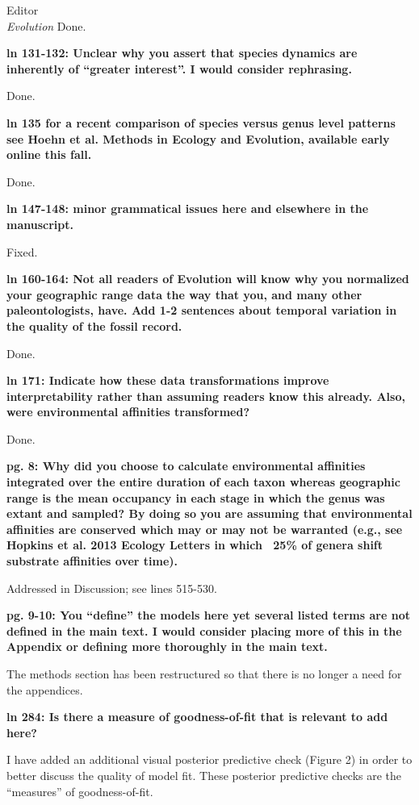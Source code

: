 \documentclass{letter}
\begin{document}
\begin{letter}{Editor \\ \textit{Evolution}}
  Done.

  \textbf{ln 131-132: Unclear why you assert that species dynamics are inherently of “greater interest”. I would consider rephrasing.}

  Done.

  \textbf{ln 135 for a recent comparison of species versus genus level patterns see Hoehn et al. Methods in Ecology and Evolution, available early online this fall.}

  Done.

  \textbf{ln 147-148: minor grammatical issues here and elsewhere in the manuscript.}

  Fixed.

  \textbf{ln 160-164: Not all readers of Evolution will know why you normalized your geographic range data the way that you, and many other paleontologists, have. Add 1-2 sentences about temporal variation in the quality of the fossil record.}

  Done.

  \textbf{ln 171: Indicate how these data transformations improve interpretability rather than assuming readers know this already. Also, were environmental affinities transformed?}

  Done.

  \textbf{pg. 8: Why did you choose to calculate environmental affinities integrated over the entire duration of each taxon whereas geographic range is the mean occupancy in each stage in which the genus was extant and sampled? By doing so you are assuming that environmental affinities are conserved which may or may not be warranted (e.g., see Hopkins et al. 2013 Ecology Letters in which ~25\% of genera shift substrate affinities over time).}

  Addressed in Discussion; see lines 515-530.

  \textbf{pg. 9-10: You “define” the models here yet several listed terms are not defined in the main text. I would consider placing more of this in the Appendix or defining more thoroughly in the main text.}

  The methods section has been restructured so that there is no longer a need for the appendices.

  \textbf{ln 284: Is there a measure of goodness-of-fit that is relevant to add here?}

  I have added an additional visual posterior predictive check (Figure 2) in order to better discuss the quality of model fit. These posterior predictive checks are the ``measures'' of goodness-of-fit.


\end{letter}
\end{document}
